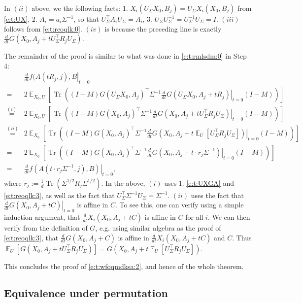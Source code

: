 \documentclass{article}
\DeclareMathOperator{\E}{\mathbb{E}}
\DeclareMathOperator{\tr}{Tr}
\newcommand*\lrb[1]{\left[ #1 \right]}
\newcommand*\lrp[1]{\left( #1 \right)}
\newcommand*\at[2]{\left.#1\right|_{#2}}
\newcommand{\US}{U_\Sigma}
\begin{document}
In $(ii)$ above, we  the following facts: 1. $X_i(\US X_0, B_j) = \US X_i(X_0, B_j)$ from \eqref{e:t:UX}, 2. $A_i = a_i \Sigma^{-1}$, so that $\US^{\top} A_i \US = A_i$, 3. $\US\US^{-1} = \US^{-1} \US = I$. $(iii)$ follows from \eqref{e:t:reoqlk:0}. $(iv)$ is because the preceding line is exactly $\frac{d}{dt} G(X_0, A_j + t \US^{\top} R_j \US)$.
\fi

The remainder of the proof is similar to what was done in \eqref{e:t:rmlsdm:0} in Step 4:
\begin{align*}
& \at{\frac{d}{dt} f(A(tR_j, j), B}{t=0}\\
=& 2\E_{X_0, U} \lrb{\tr\lrp{\lrp{I-M} G(\US X_0, A_j )^\top \Sigma^{-1} \at{\frac{d}{dt} G(\US X_0, A_j + t R_j)}{t=0} \lrp{I-M}}}\\
\overset{(i)}{=}& 2\E_{X_0,U} \lrb{\tr\lrp{\lrp{I-M} G( X_0, A_j )^\top \Sigma^{-1} \at{\frac{d}{dt} G(X_0, A_j + t \US^{\top} R_j \US)}{t=0} \lrp{I-M}}}\\
\overset{(ii)}{=}& 2\E_{X_0} \lrb{\tr\lrp{\lrp{I-M} G( X_0, A_j )^\top \Sigma^{-1} \at{\frac{d}{dt} G(X_0, A_j + t \E_U\lrb{\US^{\top} R_j \US} )}{t=0} \lrp{I-M}}}\\
=& 2\E_{X_0} \lrb{\tr\lrp{\lrp{I-M} G( X_0, A_j )^\top \Sigma^{-1} \at{\frac{d}{dt} G(X_0, A_j + t \cdot r_j \Sigma^{-1})}{t=0} \lrp{I-M}}}\\
=& \at{\frac{d}{dt} f(A(t\cdot r_j \Sigma^{-1},j), B)}{t=0},
\end{align*}
where $r_j := \frac{1}{d} \tr\lrp{\Sigma^{1/2} R_j \Sigma^{1/2}}$. In the above, $(i)$ uses 1. \eqref{e:t:UXGA} and \eqref{e:t:reoqlk:3}, as well as the fact that $\US^\top \Sigma^{-1} \US = \Sigma^{-1}$. $(ii)$ uses the fact that $\at{\frac{d}{dt} G(X_0, A_j + t C)}{t=0}$ is affine in $C$. To see this, one can verify using a simple induction argument, that $\frac{d}{dt} X_i(X_0, A_j + tC)$  is affine in $C$ for all $i$. We can then verify from the definition of $G$, e.g. using similar algebra as the proof of \eqref{e:t:reoqlk:3}, that $\frac{d}{dt} G(X_0, A_j + C)$ is affine in $\frac{d}{dt} X_i(X_0, A_j + t C)$ and $C$. Thus $\E_U\lrb{G(X_0, A_j + t \US^{\top} R_j \US)} = G(X_0, A_j + t \E_U\lrb{\US^{\top} R_j \US})$.

This concludes the proof of \eqref{e:t:wfoqmdksa:2}, and hence of the whole theorem.

\subsection{Equivalence under permutation} 
\end{document}
